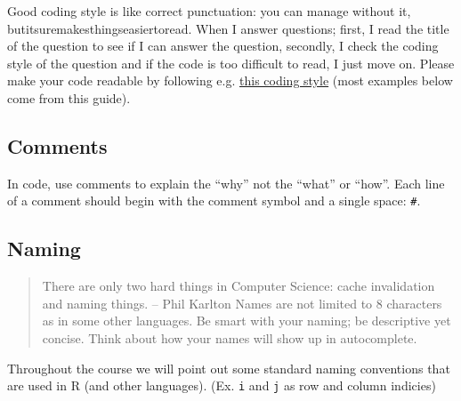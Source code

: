 \documentclass[]{book}
\newenvironment{Shaded}{\begin{snugshade}}{\end{snugshade}}
\newcommand{\KeywordTok}[1]{\textcolor[rgb]{0.13,0.29,0.53}{\textbf{#1}}}
\newcommand{\DecValTok}[1]{\textcolor[rgb]{0.00,0.00,0.81}{#1}}
\newcommand{\StringTok}[1]{\textcolor[rgb]{0.31,0.60,0.02}{#1}}
\newcommand{\CommentTok}[1]{\textcolor[rgb]{0.56,0.35,0.01}{\textit{#1}}}
\newcommand{\OperatorTok}[1]{\textcolor[rgb]{0.81,0.36,0.00}{\textbf{#1}}}
\newcommand{\NormalTok}[1]{#1}
\theoremstyle{definition}
\theoremstyle{definition}
\theoremstyle{definition}
\theoremstyle{remark}
\begin{document}
Good coding style is like correct punctuation: you can manage without
it, butitsuremakesthingseasiertoread. When I answer questions; first, I
read the title of the question to see if I can answer the question,
secondly, I check the coding style of the question and if the code is
too difficult to read, I just move on. Please make your code readable by
following e.g. \href{http://style.tidyverse.org/}{this coding style}
(most examples below come from this guide).

\subsection{Comments}\label{comments}

In code, use comments to explain the ``why'' not the ``what'' or
``how''. Each line of a comment should begin with the comment symbol and
a single space: \texttt{\#}.

\subsection{Naming}\label{naming}

\begin{quote}
There are only two hard things in Computer Science: cache invalidation
and naming things. -- Phil Karlton Names are not limited to 8 characters
as in some other languages. Be smart with your naming; be descriptive
yet concise. Think about how your names will show up in autocomplete.
\end{quote}

Throughout the course we will point out some standard naming conventions
that are used in R (and other languages). (Ex. \texttt{i} and \texttt{j}
as row and column indicies)

\begin{Shaded}
\end{Shaded}
\end{document}

